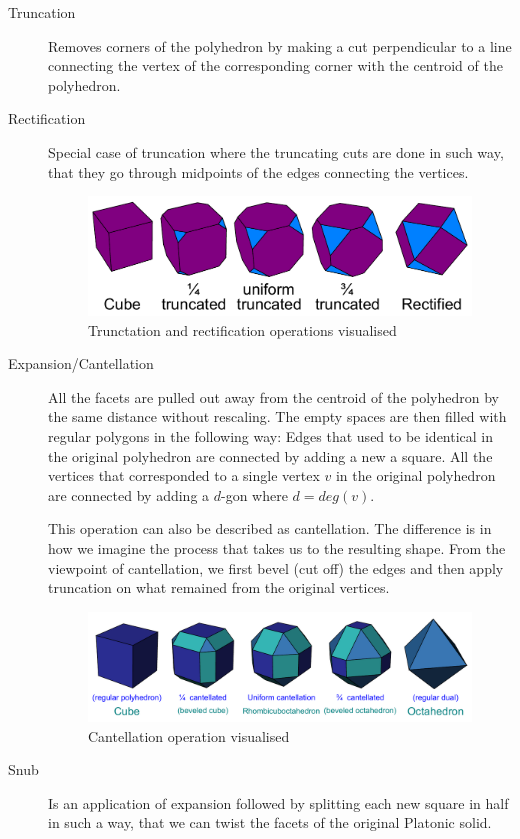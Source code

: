 \begin{description}
    \item[Truncation] Removes corners of the polyhedron by making a cut perpendicular to a line connecting the vertex of the corresponding corner with the centroid of the polyhedron.
    \item[Rectification] Special case of truncation where the truncating cuts are done in such way, that they go through midpoints of the edges connecting the vertices. 
    \begin{figure}[H]
        \centering
        \includegraphics[width=1\textwidth]{../Resources/Figs/truncation.pdf}
        \caption{Trunctation and rectification operations visualised \cite{wikimedia-cube-truncation}}
        \label{fig:truncation}
    \end{figure}
    \item[Expansion/Cantellation] All the facets are pulled out away from the centroid of the polyhedron by the same distance without rescaling. The empty spaces are then filled with regular polygons in the following way: Edges that used to be identical in the original polyhedron are connected by adding a new a square. All the vertices that corresponded to a single vertex $v$ in the original polyhedron are connected by adding a $d$-gon where $d=deg(v)$.

    This operation can also be described as cantellation. The difference is in how we imagine the process that takes us to the resulting shape. From the viewpoint of cantellation, we first bevel (cut off) the edges and then apply truncation on what remained from the original vertices.
        \begin{figure}[H]
        \centering
        \includegraphics[width=1\textwidth]{../Resources/Figs/cantellation.pdf}
        \caption{Cantellation operation visualised \cite{wikimedia-cube-cantellation}}
        \label{fig:cantellation}
    \end{figure}
    \item[Snub] Is an application of expansion followed by splitting each new square in half in such a way, that we can twist the facets of the original Platonic solid.
\end{description}


